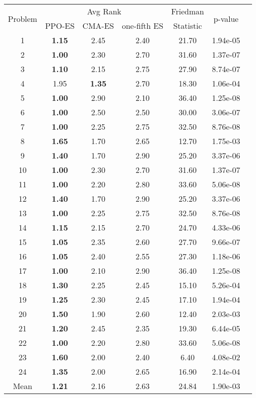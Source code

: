 
        \begin{tabular}{ccccccc}
        \toprule
        \multirow{2}{*}{Problem} & \multicolumn{3}{c}{Avg Rank} & Friedman & \multirow{2}{*}{p-value} \\
        \cline{2-4}
        & PPO-ES & CMA-ES & one-fifth ES & Statistic & \\
        \midrule
        1 & \textbf{1.15} & 2.45 & 2.40 & 21.70 & 1.94e-05 \\
2 & \textbf{1.00} & 2.30 & 2.70 & 31.60 & 1.37e-07 \\
3 & \textbf{1.10} & 2.15 & 2.75 & 27.90 & 8.74e-07 \\
4 & 1.95 & \textbf{1.35} & 2.70 & 18.30 & 1.06e-04 \\
5 & \textbf{1.00} & 2.90 & 2.10 & 36.40 & 1.25e-08 \\
6 & \textbf{1.00} & 2.50 & 2.50 & 30.00 & 3.06e-07 \\
7 & \textbf{1.00} & 2.25 & 2.75 & 32.50 & 8.76e-08 \\
8 & \textbf{1.65} & 1.70 & 2.65 & 12.70 & 1.75e-03 \\
9 & \textbf{1.40} & 1.70 & 2.90 & 25.20 & 3.37e-06 \\
10 & \textbf{1.00} & 2.30 & 2.70 & 31.60 & 1.37e-07 \\
11 & \textbf{1.00} & 2.20 & 2.80 & 33.60 & 5.06e-08 \\
12 & \textbf{1.40} & 1.70 & 2.90 & 25.20 & 3.37e-06 \\
13 & \textbf{1.00} & 2.25 & 2.75 & 32.50 & 8.76e-08 \\
14 & \textbf{1.15} & 2.15 & 2.70 & 24.70 & 4.33e-06 \\
15 & \textbf{1.05} & 2.35 & 2.60 & 27.70 & 9.66e-07 \\
16 & \textbf{1.05} & 2.40 & 2.55 & 27.30 & 1.18e-06 \\
17 & \textbf{1.00} & 2.10 & 2.90 & 36.40 & 1.25e-08 \\
18 & \textbf{1.30} & 2.25 & 2.45 & 15.10 & 5.26e-04 \\
19 & \textbf{1.25} & 2.30 & 2.45 & 17.10 & 1.94e-04 \\
20 & \textbf{1.50} & 1.90 & 2.60 & 12.40 & 2.03e-03 \\
21 & \textbf{1.20} & 2.45 & 2.35 & 19.30 & 6.44e-05 \\
22 & \textbf{1.00} & 2.20 & 2.80 & 33.60 & 5.06e-08 \\
23 & \textbf{1.60} & 2.00 & 2.40 & 6.40 & 4.08e-02 \\
24 & \textbf{1.35} & 2.00 & 2.65 & 16.90 & 2.14e-04 \\
\midrule
Mean & \textbf{1.21} & 2.16 & 2.63 & 24.84 & 1.90e-03 \\
\bottomrule
\end{tabular}